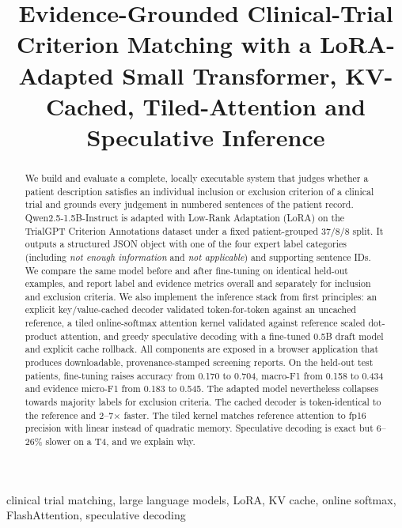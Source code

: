 \documentclass[conference]{IEEEtran}
\begin{document}
\title{Evidence-Grounded Clinical-Trial Criterion Matching with a LoRA-Adapted Small Transformer, KV-Cached, Tiled-Attention and Speculative Inference}

\author{
}
\maketitle

\begin{abstract}
We build and evaluate a complete, locally executable system that judges whether a patient
description satisfies an individual inclusion or exclusion criterion of a clinical trial and
grounds every judgement in numbered sentences of the patient record. Qwen2.5-1.5B-Instruct is
adapted with Low-Rank Adaptation (LoRA) on the TrialGPT Criterion Annotations dataset under a
fixed patient-grouped 37/8/8 split. It outputs a structured JSON object with one of the four
expert label categories (including \emph{not enough information} and \emph{not applicable})
and supporting sentence IDs. We compare the same model before and after fine-tuning on
identical held-out examples, and report label and evidence metrics overall and separately for
inclusion and exclusion criteria. We also implement the inference stack from first
principles: an explicit key/value-cached decoder validated token-for-token against an
uncached reference, a tiled online-softmax attention kernel validated against reference
scaled dot-product attention, and greedy speculative decoding with a fine-tuned 0.5B draft
model and explicit cache rollback. All components are exposed in a browser application that
produces downloadable, provenance-stamped screening reports. On the held-out test patients, fine-tuning
raises accuracy from 0.170 to 0.704, macro-F1 from 0.158 to 0.434 and evidence micro-F1 from 0.183 to 0.545.
The adapted model nevertheless collapses towards majority labels for exclusion criteria. The cached decoder is
token-identical to the reference and 2--7$\times$ faster. The tiled kernel matches reference attention to fp16
precision with linear instead of quadratic memory. Speculative decoding is exact but 6--26\% slower on a T4,
and we explain why.
\end{abstract}
\begin{IEEEkeywords}
clinical trial matching, large language models, LoRA, KV cache, online softmax, FlashAttention, speculative decoding
\end{IEEEkeywords}
\end{document}
